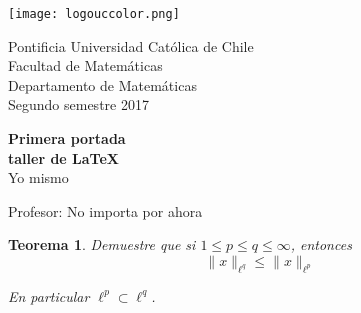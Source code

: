 \documentclass{article}
\newtheorem{teo}{Teorema}
\begin{document}
\begin{titlepage}
	\begin{minipage}{2.5cm}
		\texttt{[image: logouccolor.png]}
	\end{minipage}
	\begin{minipage}{13 cm}
		\begin{flushleft}
   			\noindent\large{\sc
				Pontificia Universidad Católica de Chile \\ 
		     		Facultad de Matemáticas \\ 
		     		Departamento de Matemáticas \\ 
				Segundo semestre 2017
		     	}
		\end{flushleft}
	\end{minipage}
	
\begin{center}
	\vspace*{\fill} %
		\Huge\textbf{Primera portada}	\\
		\Huge\textbf{taller de \LaTeX}	\\
		\LARGE{Yo mismo} \\
	\vspace*{\fill}
		
	\vfill %
		
	\Large{Profesor: No importa por ahora}

\end{center}
\end{titlepage}

\begin{teo} Demuestre que si $1 \leq p \leq q \leq \infty$, entonces
	$$\|x\|_{\ell^{q}} \leq \|x\|_{\ell^{p}}$$
	
En particular $\ell^{p} \subset \ell^{q}$.
\end{teo}
\end{document}
